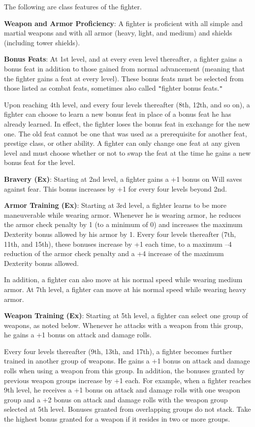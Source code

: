 				
The following are class features of the fighter.
				
\textbf{Weapon and Armor Proficiency}: A fighter is proficient with all simple and martial weapons and with all armor (heavy, light, and medium) and shields (including tower shields).
				
\textbf{Bonus Feats}: At 1st level, and at every even level thereafter, a fighter gains a bonus feat in addition to those gained from normal advancement (meaning that the fighter gains a feat at every level). These bonus feats must be selected from those listed as combat feats, sometimes also called \texttt{{}"{}}fighter bonus feats.\texttt{{}"{}}
				
Upon reaching 4th level, and every four levels thereafter (8th, 12th, and so on), a fighter can choose to learn a new bonus feat in place of a bonus feat he has already learned. In effect, the fighter loses the bonus feat in exchange for the new one. The old feat cannot be one that was used as a prerequisite for another feat, prestige class, or other ability. A fighter can only change one feat at any given level and must choose whether or not to swap the feat at the time he gains a new bonus feat for the level.
				
\textbf{Bravery (Ex)}: Starting at 2nd level, a fighter gains a +1 bonus on Will saves against fear. This bonus increases by +1 for every four levels beyond 2nd.
				
\textbf{Armor Training (Ex)}: Starting at 3rd level, a fighter learns to be more maneuverable while wearing armor. Whenever he is wearing armor, he reduces the armor check penalty by 1 (to a minimum of 0) and increases the maximum Dexterity bonus allowed by his armor by 1. Every four levels thereafter (7th, 11th, and 15th), these bonuses increase by +1 each time, to a maximum --4 reduction of the armor check penalty and a +4 increase of the maximum Dexterity bonus allowed.
				
In addition, a fighter can also move at his normal speed while wearing medium armor. At 7th level, a fighter can move at his normal speed while wearing heavy armor.
				
\textbf{Weapon Training (Ex)}: Starting at 5th level, a fighter can select one group of weapons, as noted below. Whenever he attacks with a weapon from this group, he gains a +1 bonus on attack and damage rolls.
				
Every four levels thereafter (9th, 13th, and 17th), a fighter becomes further trained in another group of weapons. He gains a +1 bonus on attack and damage rolls when using a weapon from this group. In addition, the bonuses granted by previous weapon groups increase by +1 each. For example, when a fighter reaches 9th level, he receives a +1 bonus on attack and damage rolls with one weapon group and a +2 bonus on attack and damage rolls with the weapon group selected at 5th level. Bonuses granted from overlapping groups do not stack. Take the highest bonus granted for a weapon if it resides in two or more groups.
				
